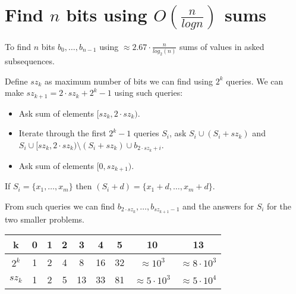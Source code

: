 \section*{Find $n$ bits using $O(\frac{n}{logn})$ sums}
To find $n$ bits $b_0, \dots, b_{n - 1}$ using $\approx 2.67 \cdot \frac{n}{log_2(n)}$ sums of values in asked subsequences.

Define $sz_k$ as maximum number of bits we can find using $2^k$ queries.
We can make $sz_{k + 1} = 2 \cdot sz_k + 2^k - 1$ using such queries:

\begin{itemize}
\item Ask sum of elements $[sz_k, 2 \cdot sz_k)$.
\item Iterate through the first $2^k - 1$ queries $S_i$, ask $S_i \cup (S_i + sz_k)$ and $S_i \cup [sz_k, 2 \cdot sz_k) \setminus (S_i + sz_k) \cup b_{2 \cdot sz_k + i}$.    
\item Ask sum of elements $[0, sz_{k + 1})$.
\end{itemize}

If $S_i = \{x_1, \dots, x_m\}$ then $(S_i + d) = \{x_1 + d, \dots, x_m + d \}$.

From such queries we can find $b_{2 \cdot sz_k}, \dots, b_{sz_{k + 1} - 1}$ and the answers for $S_i$ for the two smaller problems.

\begin{tabular}{|c|c|c|c|c|c|c|c|c|}
\hline
k 		& 0 & 1 & 2 & 3  & 4  & 5   & 10     		 		& 13 					 \\
\hline
$2^k$ 	& 1 & 2 & 4 & 8  & 16 & 32 & $\approx 10^3$ 		& $\approx 8 \cdot 10^3$ \\
\hline
$sz_k$ 	& 1 & 2 & 5 & 13 & 33 & 81 & $\approx 5 \cdot 10^3$ & $\approx 5 \cdot 10^4$ \\
\hline
\end{tabular}
